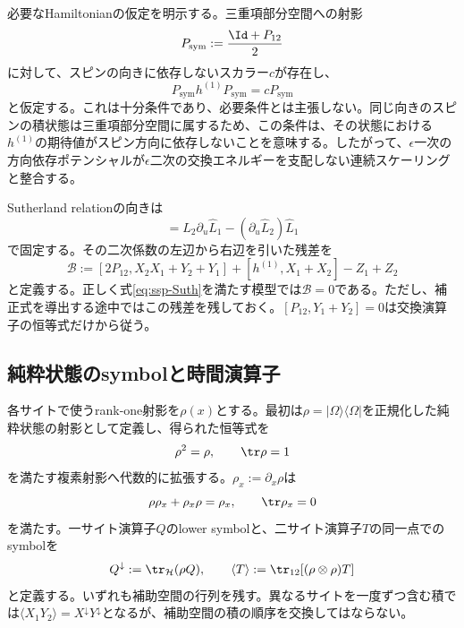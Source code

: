 必要なHamiltonianの仮定を明示する。三重項部分空間への射影
\begin{equation}
P_{\mathrm{sym}}:=\frac{\Id+P_{12}}2
\end{equation}
に対して、スピンの向きに依存しないスカラー$c$が存在し、
\begin{equation}
P_{\mathrm{sym}}h^{(1)}P_{\mathrm{sym}}=cP_{\mathrm{sym}}
\label{eq:ssp-triplet}
\end{equation}
と仮定する。これは十分条件であり、必要条件とは主張しない。同じ向きのスピンの積状態は三重項部分空間に属するため、この条件は、その状態における$h^{(1)}$の期待値がスピン方向に依存しないことを意味する。したがって、$\epsilon$一次の方向依存ポテンシャルが$\epsilon$二次の交換エネルギーを支配しない連続スケーリングと整合する。

Sutherland relationの向きは
\begin{equation}
[h_{12},\widehat L_2\widehat L_1]
=\widehat L_2\partial_u\widehat L_1-(\partial_u\widehat L_2)\widehat L_1
\label{eq:ssp-Suth}
\end{equation}
で固定する。その二次係数の左辺から右辺を引いた残差を
\begin{equation}
\mathcal B:=[2P_{12},X_2X_1+Y_2+Y_1]
+[h^{(1)},X_1+X_2]-Z_1+Z_2
\label{eq:ssp-B}
\end{equation}
と定義する。正しく式\eqref{eq:ssp-Suth}を満たす模型では$\mathcal B=0$である。ただし、補正式を導出する途中ではこの残差を残しておく。$[P_{12},Y_1+Y_2]=0$は交換演算子の恒等式だけから従う。

\subsection{純粋状態のsymbolと時間演算子}

各サイトで使うrank-one射影を$\rho(x)$とする。最初は$\rho=|\Omega\rangle\langle\Omega|$を正規化した純粋状態の射影として定義し、得られた恒等式を
\begin{equation}
\rho^2=\rho,\qquad\tr\rho=1
\label{eq:ssp-rho}
\end{equation}
を満たす複素射影へ代数的に拡張する。$\rho_x:=\partial_x\rho$は
\begin{equation}
\rho\rho_x+\rho_x\rho=\rho_x,\qquad\tr\rho_x=0
\label{eq:ssp-rhox}
\end{equation}
を満たす。一サイト演算子$Q$のlower symbolと、二サイト演算子$T$の同一点でのsymbolを
\begin{equation}
Q^\downarrow:=\tr_{\mathcal H}(\rho Q),\qquad
\langle T\rangle:=\tr_{12}[(\rho\otimes\rho)T]
\label{eq:ssp-symbols}
\end{equation}
と定義する。いずれも補助空間の行列を残す。異なるサイトを一度ずつ含む積では$\langle X_1Y_2\rangle=X^\downarrow Y^\downarrow$となるが、補助空間の積の順序を交換してはならない。

